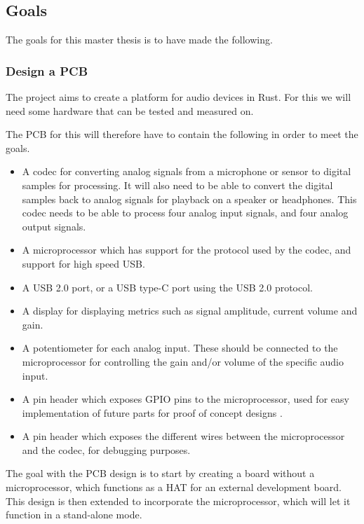 \subsection{Goals}

The goals for this master thesis is to have made the following.

\subsubsection{Design a PCB}

The project aims to create a platform for audio devices in Rust. For this we will need some hardware 
that can be tested and measured on.

The PCB for this will therefore have to contain the following in order to meet the goals.

\begin{itemize}
	\item A codec for converting analog signals from a microphone or sensor to digital samples for
	processing. 
	It will also need to be able to convert the digital samples back to analog signals for playback 
	on a speaker or headphones.
	This codec needs to be able to process four analog input signals, and four analog output signals.
	\item A microprocessor which has support for the protocol used by the codec, and support for high 
	speed USB.
	\item A USB 2.0 port, or a USB type-C port using the USB 2.0 protocol.
	\item A display for displaying metrics such as signal amplitude, current volume and gain.
	\item A potentiometer for each analog input. These should be connected to the microprocessor for 
	controlling the gain and/or volume of the specific audio input.
	\item A pin header which exposes GPIO pins to the microprocessor, used for easy implementation of 
	future parts for proof of concept designs .
	\item A pin header which exposes the different wires between the microprocessor and the codec, 
	for debugging purposes.
\end{itemize}

The goal with the PCB design is to start by creating a board without a microprocessor, which functions 
as a HAT  for an external development board.
This design is then extended to incorporate the microprocessor, which will let it function in a 
stand-alone mode.

